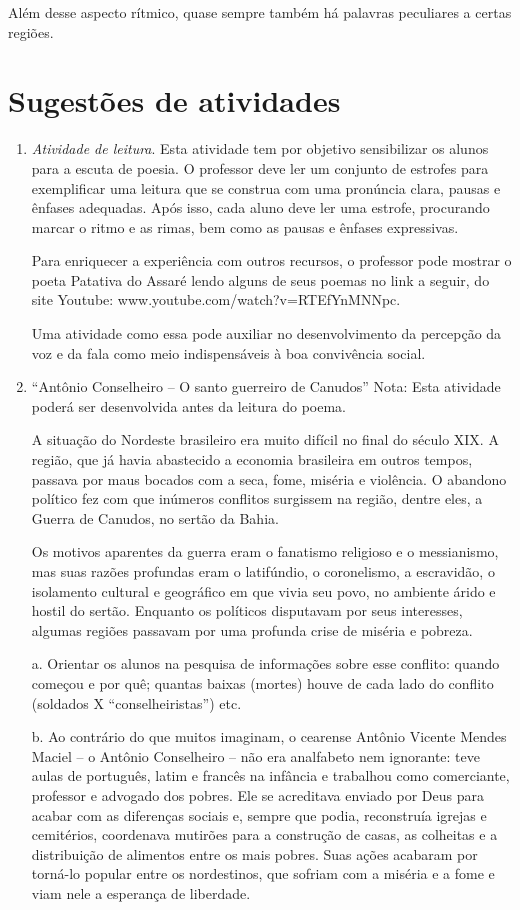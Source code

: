 Além desse aspecto rítmico, quase sempre também há palavras peculiares a certas
regiões. 

\section{Sugestões de atividades}
\begin{enumerate}

\item \textit{Atividade de leitura}. Esta atividade tem por objetivo sensibilizar
os alunos para a escuta de poesia. O professor deve ler um conjunto de
estrofes para exemplificar uma leitura que se construa com uma
pronúncia clara, pausas e ênfases adequadas. Após isso, cada aluno deve
ler uma estrofe, procurando marcar o ritmo e as rimas, bem como as
pausas e ênfases expressivas.

Para enriquecer a experiência com outros recursos, o professor pode
mostrar o poeta Patativa do Assaré lendo alguns de seus poemas no link
a seguir, do site Youtube: www.youtube.com/watch?v=RTEfYnMNNpc. 

Uma atividade como essa pode auxiliar no desenvolvimento da percepção da
voz e da fala como meio indispensáveis à boa convivência social.

\item “Antônio Conselheiro – O santo guerreiro de Canudos”
Nota: Esta atividade poderá ser desenvolvida antes da leitura do poema.

A situação do Nordeste brasileiro era muito difícil no final do século
XIX. A região, que já havia abastecido a economia brasileira em outros
tempos, passava por maus bocados com a seca, fome, miséria e violência.
O abandono político fez com que inúmeros conflitos surgissem na região,
dentre eles, a Guerra de Canudos, no sertão da Bahia.

Os motivos aparentes da guerra eram o fanatismo religioso e o
messianismo, mas suas razões profundas eram o latifúndio, o
coronelismo, a escravidão, o isolamento cultural e geográfico em que
vivia seu povo, no ambiente árido e hostil do sertão. Enquanto os
políticos disputavam por seus interesses, algumas regiões passavam por
uma profunda crise de miséria e pobreza. 


a. Orientar os alunos na pesquisa de informações sobre esse conflito:
quando começou e por quê; quantas baixas (mortes) houve de cada lado do
conflito (soldados X “conselheiristas”) etc.

b. Ao contrário do que muitos imaginam, o cearense Antônio Vicente
Mendes Maciel – o Antônio Conselheiro – não era analfabeto nem
ignorante: teve aulas de português, latim e francês na infância e
trabalhou como comerciante, professor e advogado dos pobres. Ele se
acreditava enviado por Deus para acabar com as diferenças sociais e,
sempre que podia, reconstruía igrejas e cemitérios, coordenava mutirões
para a construção de casas, as colheitas e a distribuição de alimentos
entre os mais pobres. Suas ações acabaram por torná-lo popular entre os
nordestinos, que sofriam com a miséria e a fome e viam nele a esperança
de liberdade.


\end{enumerate}
